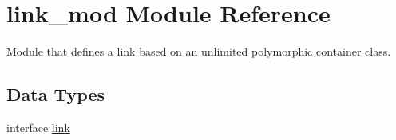 \hypertarget{namespacelink__mod}{}\section{link\+\_\+mod Module Reference}
\label{namespacelink__mod}


Module that defines a link based on an unlimited polymorphic container class.  


\subsection*{Data Types}
\begin{DoxyCompactItemize}
\item 
interface \mbox{\hyperlink{structlink__mod_1_1link}{link}}
\end{DoxyCompactItemize}

